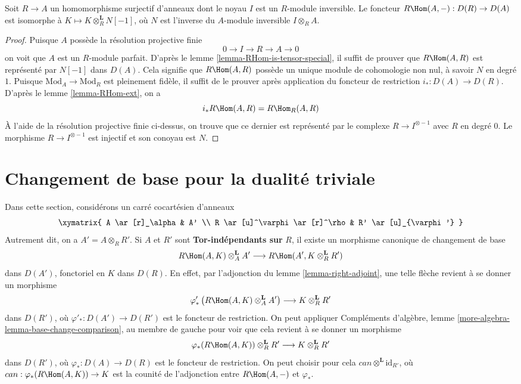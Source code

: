 \begin{lemma}
\label{lemma-compute-for-effective-Cartier-algebraic}
Soit $R \to A$ un homomorphisme surjectif d'anneaux dont le noyau $I$
est un $R$-module inversible. Le foncteur
$R\Hom(A, -) : D(R) \to D(A)$
est isomorphe à $K \mapsto K \otimes_R^\mathbf{L} N[-1]$,
où $N$ est l'inverse du $A$-module inversible $I \otimes_R A$.
\end{lemma}

\begin{proof}
Puisque $A$ possède la résolution projective finie
$$
0 \to I \to R \to A \to 0
$$
on voit que $A$ est un $R$-module parfait.
D'après le lemme \ref{lemma-RHom-is-tensor-special}, il suffit de prouver que $R\Hom(A, R)$
est représenté par $N[-1]$ dans $D(A)$.
Cela signifie que $R\Hom(A, R)$ possède un unique module de cohomologie non nul,
à savoir $N$ en degré $1$.
Puisque $\text{Mod}_A \to \text{Mod}_R$ est pleinement fidèle, il suffit de le prouver
après application du foncteur de restriction $i_* : D(A) \to D(R)$.
D'après le lemme \ref{lemma-RHom-ext}, on a
$$
i_*R\Hom(A, R) = R\Hom_R(A, R)
$$
À l'aide de la résolution projective finie ci-dessus, on trouve que
ce dernier est représenté par le complexe $R \to I^{\otimes -1}$ avec $R$
en degré $0$. Le morphisme $R \to I^{\otimes -1}$ est injectif
et son conoyau est $N$.
\end{proof}





\section{Changement de base pour la dualité triviale}
\label{section-base-change-trivial-duality}

\noindent
Dans cette section, considérons un carré cocartésien d'anneaux
$$
\xymatrix{
A \ar[r]_\alpha & A' \\
R \ar[u]^\varphi \ar[r]^\rho & R' \ar[u]_{\varphi'}
}
$$
Autrement dit, on a $A' = A \otimes_R R'$. Si $A$ et $R'$
sont {\bf Tor-indépendants sur} $R$,
il existe un morphisme canonique de changement de base
\begin{equation}
\label{equation-base-change}
R\Hom(A, K) \otimes_A^\mathbf{L} A'
\longrightarrow
R\Hom(A', K \otimes_R^\mathbf{L} R')
\end{equation}
dans $D(A')$, fonctoriel en $K$ dans $D(R)$.
En effet, par l'adjonction du lemme \ref{lemma-right-adjoint},
une telle flèche revient à se donner un morphisme
$$
\varphi'_*\left(R\Hom(A, K) \otimes_A^\mathbf{L} A'\right)
\longrightarrow
K \otimes_R^\mathbf{L} R'
$$
dans $D(R')$, où $\varphi'_* : D(A') \to D(R')$ est le foncteur de restriction.
On peut appliquer Compléments d'algèbre, lemme \ref{more-algebra-lemma-base-change-comparison},
au membre de gauche pour voir que cela revient à se donner un morphisme
$$
\varphi_*(R\Hom(A, K)) \otimes_R^\mathbf{L} R'
\longrightarrow
K \otimes_R^\mathbf{L} R'
$$
dans $D(R')$, où $\varphi_* : D(A) \to D(R)$ est le foncteur de restriction.
On peut choisir pour cela $can \otimes^\mathbf{L} \text{id}_{R'}$,
où $can : \varphi_*(R\Hom(A, K)) \to K$ est la counité de l'adjonction entre $R\Hom(A, -)$ et $\varphi_*$.

